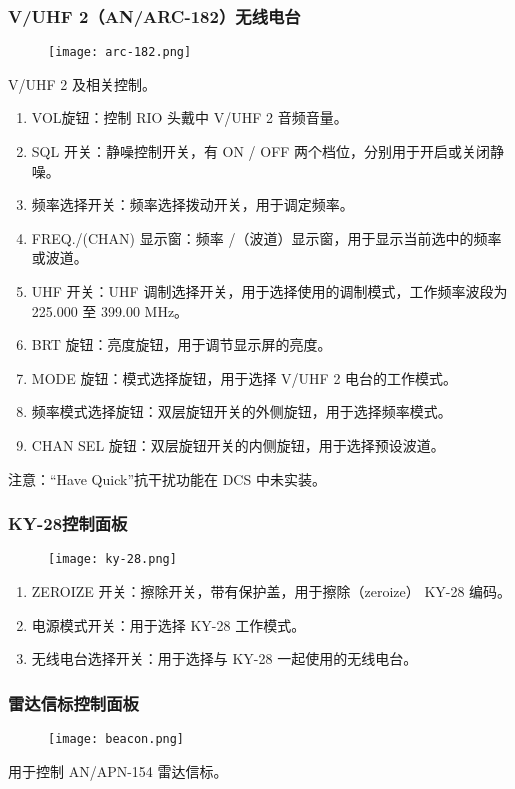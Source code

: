 \subsubsection{V/UHF 2（AN/ARC-182）无线电台}
\begin{figure}[htb]
  \center
  \texttt{[image: arc-182.png]}
\end{figure}
V/UHF 2 及相关控制。

\begin{enumerate}
  \item VOL旋钮：控制 RIO 头戴中 V/UHF 2 音频音量。
  \item SQL 开关：静噪控制开关，有 ON / OFF 两个档位，分别用于开启或关闭静噪。
  \item 频率选择开关：频率选择拨动开关，用于调定频率。
  \item FREQ./(CHAN) 显示窗：频率 /（波道）显示窗，用于显示当前选中的频率或波道。
  \item UHF 开关：UHF 调制选择开关，用于选择使用的调制模式，工作频率波段为 225.000 至 399.00 MHz。
  \item BRT 旋钮：亮度旋钮，用于调节显示屏的亮度。
  \item MODE 旋钮：模式选择旋钮，用于选择 V/UHF 2 电台的工作模式。
  \item 频率模式选择旋钮：双层旋钮开关的外侧旋钮，用于选择频率模式。
  \item CHAN SEL 旋钮：双层旋钮开关的内侧旋钮，用于选择预设波道。  
\end{enumerate}
注意：“Have Quick”抗干扰功能在 DCS 中未实装。

\subsubsection{KY-28控制面板}
\begin{figure}[htb]
  \center
  \texttt{[image: ky-28.png]}
\end{figure}

\begin{enumerate}
  \item ZEROIZE 开关：擦除开关，带有保护盖，用于擦除（zeroize） KY-28 编码。
  \item 电源模式开关：用于选择 KY-28 工作模式。
  \item 无线电台选择开关：用于选择与 KY-28 一起使用的无线电台。
\end{enumerate}

\subsubsection{雷达信标控制面板}
\begin{figure}[htb]
  \center
  \texttt{[image: beacon.png]}
\end{figure}
用于控制 AN/APN-154 雷达信标。

